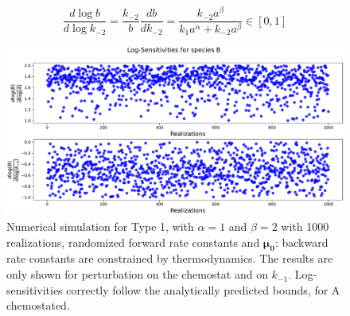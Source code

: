 \documentclass{article}
\begin{document}

	
	\begin{center}
		\begin{equation}
			\frac{d \log b}{d \log k_{-2}} = \frac{k_{-2}}{b} \frac{d b}{d k_{-2}}=\frac{k_{-2}a^{\beta}}{k_1 a^{\alpha}+k_{-2} a^{\beta}} \in \left[0,1 \right]
		\end{equation}
	\end{center}
	
	\begin{figure}[H]
		\centering
		\includegraphics[width=1 \linewidth]{Sens_type1_chemoX1.pdf}
		\caption{\small{Numerical simulation for Type 1, with $\alpha = 1$ and $\beta = 2$ with 1000 realizations, randomized forward rate constants and $\boldsymbol{\mu_0}$: backward rate constants are constrained by thermodynamics. The results are only shown for perturbation on the chemostat and on $k_{-1}$. Log-sensitivities correctly follow the analytically predicted bounds, for A chemostated.}}
		\label{Fig. 1}
	\end{figure}
	
\end{document}
